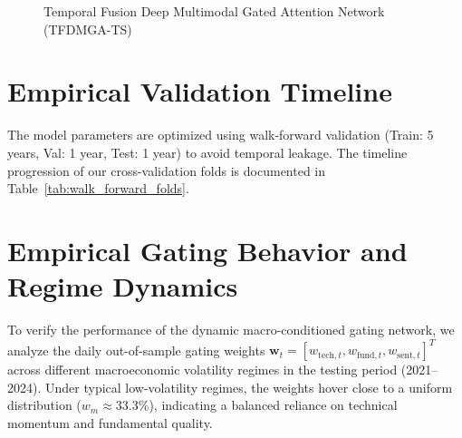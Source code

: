 \documentclass[11pt]{article}
\begin{document}
\begin{figure}[H]
    \caption{Temporal Fusion Deep Multimodal Gated Attention Network (TFDMGA-TS)}
    \label{fig:tfdmga_architecture}
\end{figure}

\section{Empirical Validation Timeline}
The model parameters are optimized using walk-forward validation (Train: 5 years, Val: 1 year, Test: 1 year) to avoid temporal leakage. The timeline progression of our cross-validation folds is documented in Table~\ref{tab:walk_forward_folds}.

\begin{table}[H]
    \centering
    \caption{Walk-Forward Cross-Validation Timeline Folds}
    \label{tab:walk_forward_folds}
\end{table}

\section{Empirical Gating Behavior and Regime Dynamics}
To verify the performance of the dynamic macro-conditioned gating network, we analyze the daily out-of-sample gating weights $\mathbf{w}_t = [w_{\text{tech},t}, w_{\text{fund},t}, w_{\text{sent},t}]^T$ across different macroeconomic volatility regimes in the testing period (2021--2024). Under typical low-volatility regimes, the weights hover close to a uniform distribution ($w_m \approx 33.3\%$), indicating a balanced reliance on technical momentum and fundamental quality.
\end{document}
